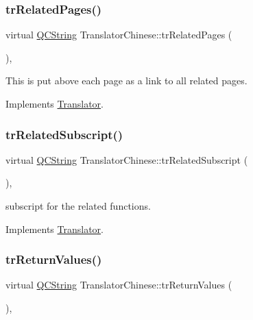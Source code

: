 \subsubsection{\texorpdfstring{trRelatedPages()}{trRelatedPages()}}
{\footnotesize\ttfamily virtual \mbox{\hyperlink{class_q_c_string}{Q\+C\+String}} Translator\+Chinese\+::tr\+Related\+Pages (\begin{DoxyParamCaption}{ }\end{DoxyParamCaption})\hspace{0.3cm}{\ttfamily [inline]}, {\ttfamily [virtual]}}

This is put above each page as a link to all related pages. 

Implements \mbox{\hyperlink{class_translator}{Translator}}.

\mbox{\label{class_translator_chinese_ad2c6aa905dbbf109f106930ed9cb6100}} 
\subsubsection{\texorpdfstring{trRelatedSubscript()}{trRelatedSubscript()}}
{\footnotesize\ttfamily virtual \mbox{\hyperlink{class_q_c_string}{Q\+C\+String}} Translator\+Chinese\+::tr\+Related\+Subscript (\begin{DoxyParamCaption}{ }\end{DoxyParamCaption})\hspace{0.3cm}{\ttfamily [inline]}, {\ttfamily [virtual]}}

subscript for the related functions. 

Implements \mbox{\hyperlink{class_translator}{Translator}}.

\mbox{\label{class_translator_chinese_a306f23c07ef2bcca2b50327eb823b0d0}} 
\subsubsection{\texorpdfstring{trReturnValues()}{trReturnValues()}}
{\footnotesize\ttfamily virtual \mbox{\hyperlink{class_q_c_string}{Q\+C\+String}} Translator\+Chinese\+::tr\+Return\+Values (\begin{DoxyParamCaption}{ }\end{DoxyParamCaption})\hspace{0.3cm}{\ttfamily [inline]}, {\ttfamily [virtual]}}

